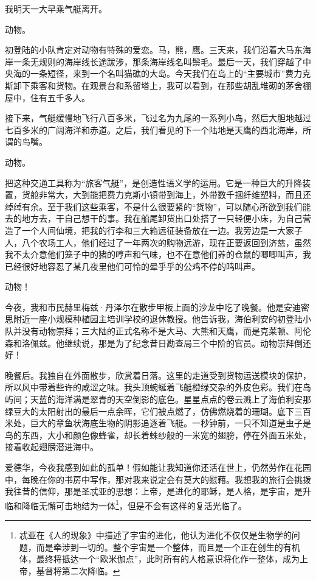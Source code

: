 \documentclass[AutoFakeBold=true]{book}
\begin{document}
我明天一大早乘气艇离开。

\vspace*{1em}{\kaishu 第十日：}

动物。

初登陆的小队肯定对动物有特殊的爱恋。马，熊，鹰。三天来，我们沿着大马东海岸一条无规则的海岸线长途跋涉，那条海岸线名叫鬃毛。最后一天，我们穿越了中央海的一条短径，来到一个名叫猫礁的大岛。今天我们在岛上的``主要城市''费力克斯卸下乘客和货物。在观景台和系留塔上，我可以看到，在那些胡乱堆砌的茅舍棚屋中，住有五千多人。

接下来，气艇缓慢地飞行八百多米，飞过名为九尾的一系列小岛，然后大胆地越过七百多米的广阔海洋和赤道。之后，我们看见的下一个陆地是天鹰的西北海岸，所谓的鸟嘴。

动物。

把这种交通工具称为``旅客气艇''，是创造性语义学的运用。它是一种巨大的升降装置，货舱非常大，大到能把费力克斯小镇带到海上，外带数千捆纤维塑料，而且还绰绰有余。至于我们这些乘客，不是什么很要紧的``货物''，可以随心所欲到我们能去的地方去，干自己想干的事。我在船尾卸货出口处搭了一只轻便小床，为自己营造了一个人间仙境，把我的行李和三大箱远征装备放在一边。我旁边是一大家子人，八个农场工人，他们经过了一年两次的购物远游，现在正要返回到济慈，虽然我不太介意他们笼子中的猪的哼声和气味，也不在意他们养的仓鼠的唧唧叫声，我已经很好地容忍了某几夜里他们可怜的晕乎乎的公鸡不停的鸣叫声。

动物！

\vspace*{1em}{\kaishu 第十一日：}

今夜，我和市民赫里梅兹·丹泽尔在散步甲板上面的沙龙中吃了晚餐。他是安迪密思附近一座小规模种植园主培训学校的退休教授。他告诉我，海伯利安的初登陆小队并没有动物崇拜；三大陆的正式名称不是大马、大熊和天鹰，而是克莱顿、阿伦森和洛佩兹。他继续说，那是为了纪念昔日勘查局三个中阶的官员。动物崇拜倒还好！

晚餐后。我独自在外面散步，欣赏着日落。这里的走道受到货物运送模块的保护，所以风中带着些许的咸涩之味。我头顶蜿蜒着飞艇橙绿交杂的外皮色彩。我们在岛屿间；天蓝的海洋满是翠青的天空倒影的底色。星星点点的卷云溅上了海伯利安那绿豆大的太阳射出的最后一点余晖，它们被点燃了，仿佛燃烧着的珊瑚。底下三百米处，巨大的章鱼状海底生物的阴影追逐着飞艇。一秒钟前，一只不知道是虫子是鸟的东西，大小和颜色像蜂雀，却长着蛛纱般的一米宽的翅膀，停在外面五米处，接着收起翅膀潜进海中。

爱德华，今夜我感到如此的孤单！假如能让我知道你还活在世上，仍然劳作在花园中，每晚在你的书房中写作，那对我来说定会有莫大的慰藉。我想我的旅行会挑拨我往昔的信仰，那是圣忒亚的思想：上帝，是进化的耶稣，是人格，是宇宙，是升临和降临无懈可击地结为一体\footnote{忒亚在《人的现象》中描述了宇宙的进化，他认为进化不仅仅是生物学的问题，而是牵涉到一切的。整个宇宙是一个整体，而且是一个正在创生的有机体，最终将抵达一个``欧米伽点''，此时所有的人格意识将化作一整体，成为上帝，基督将第二次降临。}，但是不会有这样的复活光临了。
\end{document}
